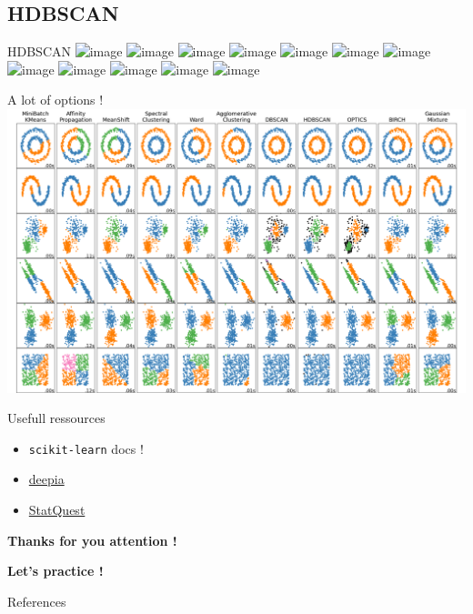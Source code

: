 \documentclass{irdbeamer}
\begin{document}
\subsection{HDBSCAN}
\begin{frame}{HDBSCAN}
    \centering
    \includegraphics<1>[width=.7\textwidth]{./figs/hdbscan/1.png}%
    \includegraphics<2>[width=.7\textwidth]{./figs/hdbscan/2.png}%
    \includegraphics<3>[width=.7\textwidth]{./figs/hdbscan/3.png}%
    \includegraphics<4>[width=.7\textwidth]{./figs/hdbscan/4.png}%
    \includegraphics<5>[width=.7\textwidth]{./figs/hdbscan/5.png}%
    \includegraphics<6>[width=.7\textwidth]{./figs/hdbscan/6.png}%
    \includegraphics<7>[width=.7\textwidth]{./figs/hdbscan/7.png}%
    \includegraphics<8>[width=.7\textwidth]{./figs/hdbscan/8.png}%
    \includegraphics<9>[width=.7\textwidth]{./figs/hdbscan/9.png}%
    \includegraphics<10>[width=.7\textwidth]{./figs/hdbscan/10.png}%
    \includegraphics<11>[width=.7\textwidth]{./figs/hdbscan/11.png}%
    \includegraphics<12>[width=.7\textwidth]{./figs/hdbscan/12.png}%
\end{frame}

\begin{frame}{A lot of options !}
    \centering
    \vspace{-.2cm}
    \includegraphics[width=.8\textwidth]{./figs/all_clusterings.png}
\end{frame}

\begin{frame}{Usefull ressources}

\begin{itemize}
    \item \texttt{scikit-learn} docs !
    \item \href{https://www.youtube.com/@Deepia-ls2fo}{deepia}
    \item \href{https://www.youtube.com/@statquest}{StatQuest}
\end{itemize}
\end{frame}

\begin{frame}[plain]
    \Huge{\textbf{Thanks for you attention !}}
    
    \vfill
    
    \LARGE{\textbf{Let's practice !}}
\end{frame}

\appendix
\begin{frame}[allowframebreaks]{References}
    {\footnotesize \printbibliography[heading=none]}
\end{frame}
\end{document}
